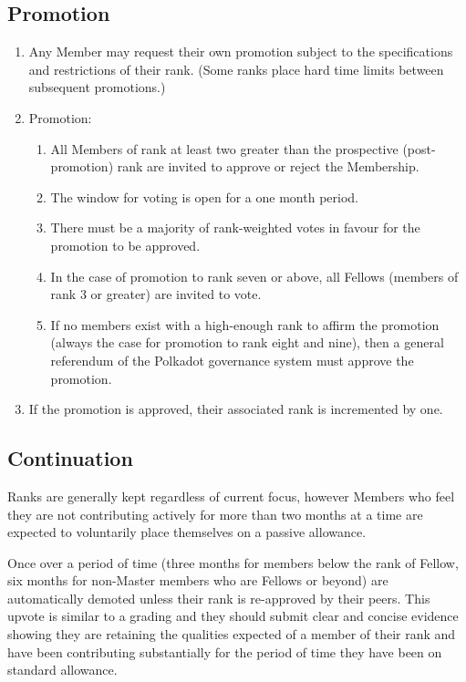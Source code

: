 \documentclass[9pt,oneside]{amsart}
\begin{document}
\subsection{Promotion}

\begin{enumerate}
\item Any Member may request their own promotion subject to the specifications and restrictions of their rank. (Some ranks place hard time limits between subsequent promotions.)
\item Promotion:
  \begin{enumerate}
    \item All Members of rank at least two greater than the prospective (post-promotion) rank are invited to approve or reject the Membership.
    \item The window for voting is open for a one month period.
    \item There must be a majority of rank-weighted votes in favour for the promotion to be approved.
    \item In the case of promotion to rank seven or above, all Fellows (members of rank 3 or greater) are invited to vote.
    \item If no members exist with a high-enough rank to affirm the promotion (always the case for promotion to rank eight and nine), then a general referendum of the Polkadot governance system must approve the promotion.
  \end{enumerate}
\item If the promotion is approved, their associated rank is incremented by one.
\end{enumerate}

\subsection{Continuation}

Ranks are generally kept regardless of current focus, however Members who feel they are not contributing actively for more than two months at a time are expected to voluntarily place themselves on a passive allowance.

Once over a period of time (three months for members below the rank of Fellow, six months for non-Master members who are Fellows or beyond) are automatically demoted unless their rank is re-approved by their peers. This upvote is similar to a grading and they should submit clear and concise evidence showing they are retaining the qualities expected of a member of their rank and have been contributing substantially for the period of time they have been on standard allowance.
\end{document}

